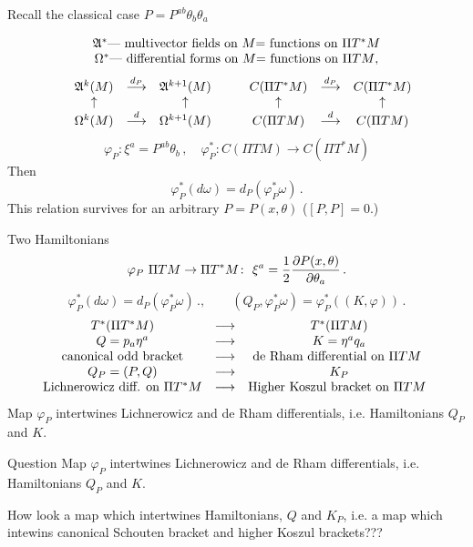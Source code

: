 \documentclass{beamer}
\def\w {{\omega}}
\def\p{\partial}
\def\p {\partial}
\begin{document}
\begin{frame}{Recall the classical case $P=P^{ab}\theta_b\theta_a$}
     
          $$
      \begin{matrix}
\hbox{$\mathfrak {A}^*$--- multivector fields on $M$=
                     functions on $\Pi T^*M$}\cr
\hbox{$\Omega^*$--- differential forms on $M$=
                     functions on $\Pi TM$},\cr
       \end{matrix}
         $$
            $$
          \begin{matrix}
     &\mathfrak{A}^k(M)&{\buildrel d_P\over \longrightarrow} 
       &\mathfrak{A}^{k+1}(M)\cr
        &\uparrow& &\uparrow\cr 
     &\Omega^k(M)&{\buildrel d\over \longrightarrow} 
       &\Omega^{k+1}(M)\cr
        \end{matrix}
        \qquad
           \begin{matrix}
     &C(\Pi T^*M)&{\buildrel d_P\over \longrightarrow} 
       &C(\Pi T^*M)\cr
        &\uparrow& &\uparrow\cr 
     &C(\Pi TM)&{\buildrel d\over \longrightarrow} 
       &C(\Pi TM)\cr
        \end{matrix}
            $$
            $$
\varphi_P\colon \xi^a=P^{ab}\theta_b\,,\quad
\varphi_P^*\colon C(\Pi TM)\to C(\Pi T^*M)
           $$ 
Then     
       $$
     \varphi_P^*(d\w)=d_P(\varphi_P^*\w)\,.
            $$
This relation survives for an arbitrary  $P=P(x,\theta)$
($[P,P]=0$.)
\end{frame}
\begin{frame}{Two Hamiltonians}
         $$
      \varphi_P\,\,\Pi TM\to\Pi T^*M\colon\,\,
 \xi^a={1\over 2}{\p P(x,\theta)\over \p \theta_a}\,.
         $$
         $$
     \varphi_P^*(d\w)=d_P(\varphi_P^*\w)\,.,\qquad
(Q_P,\varphi_P^*\w)=\varphi_P^*\left((K,\varphi)\right)\,.
         $$
          $$
       \begin{matrix}
    T^*(\Pi T^*M) &\longrightarrow & T^*(\Pi TM)\cr
             Q=p_a\eta^a& \longrightarrow &  K=\eta^aq_a\cr
        \hbox{canonical odd bracket} &\longrightarrow&
         \hbox{de Rham differential on $\Pi TM$ }\cr
     Q_P=(P,Q)& \longrightarrow &  K_P\cr
        \hbox{Lichnerowicz diff. on $\Pi T^*M$} &\longrightarrow&
         \hbox{Higher Koszul bracket on $\Pi TM$ }\cr 
       \end{matrix}
        $$
         $$
         $$
Map $\varphi_P$ intertwines Lichnerowicz and de Rham differentials,
i.e. Hamiltonians $Q_P$ and $K$.



\end{frame}
\begin{frame}{Question}
Map $\varphi_P$ intertwines Lichnerowicz and de Rham differentials,
i.e. Hamiltonians $Q_P$ and $K$.


\bigskip

How look a map which intertwines Hamiltonians, $Q$ and $K_P$,
i.e. a map which intewins canonical Schouten bracket and higher 
Koszul brackets???


\end{frame}
\end{document}
